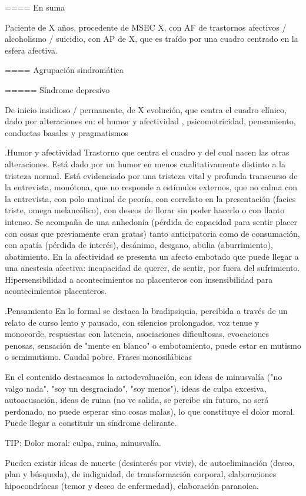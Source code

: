 ==== En suma

Paciente de X años, procedente de MSEC X, con AF de trastornos afectivos / alcoholismo / suicidio, con AP de X, que es traído por una cuadro centrado en la esfera afectiva.

==== Agrupación sindromática

===== Síndrome depresivo

De inicio insidioso / permanente, de X evolución, que centra el cuadro clínico, dado por alteraciones en: el humor y afectividad , psicomotricidad, pensamiento, conductas basales y pragmatismos

.Humor y afectividad
Trastorno que centra el cuadro y del cual nacen las otras alteraciones. Está dado por un humor en menos cualitativamente distinto a la tristeza normal. Está evidenciado por una tristeza vital y profunda transcurso de la entrevista, monótona, que no responde a estímulos externos, que no calma con la entrevista, con polo matinal de peoría, con correlato en la presentación (facies triste, omega melancólico), con deseos de llorar sin poder hacerlo o con llanto intenso. Se acompaña de una anhedonia (pérdida de capacidad para sentir placer con cosas que previamente eran gratas) tanto anticipatoria como de consumación, con apatía (pérdida de interés), desánimo, desgano, abulia (aburrimiento), abatimiento. En la afectividad se presenta un afecto embotado que puede llegar a una anestesia afectiva: incapacidad de querer, de sentir, por fuera del sufrimiento. Hipersensibilidad a acontecimientos no placenteros con insensibilidad para acontecimientos placenteros.

.Pensamiento
En lo formal se destaca la bradipsiquia, percibida a través de un relato de curso lento y pausado, con silencios prolongados, voz tenue y monocorde, respuestas con latencia, asociaciones dificultosas, evocaciones penosas, sensación de "mente en blanco" o embotamiento, puede estar en mutismo o semimutismo. Caudal pobre. Frases monosilábicas

En el contenido destacamos la autodevaluación, con ideas de minusvalía ("no valgo nada", "soy un desgraciado", "soy menos"), ideas de culpa excesiva, autoacusación, ideas de ruina (no ve salida, se percibe sin futuro, no será perdonado, no puede esperar sino cosas malas), lo que constituye el dolor moral. Puede llegar a constituir un síndrome delirante.

TIP: Dolor moral: culpa, ruina, minusvalía.

Pueden existir ideas de muerte (desinterés por vivir), de autoeliminación (deseo, plan y búsqueda), de indignidad, de transformación corporal, elaboraciones hipocondríacas (temor y deseo de enfermedad), elaboración paranoica.

